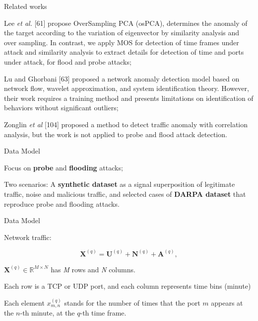 \documentclass[newPxFont, numfooter, sectionpages]{beamer}
\begin{document}
\begin{frame}[c]{Related works}
	
	Lee \emph{et al.} [61] propose OverSampling PCA (osPCA), determines the anomaly of the target according to the variation of eigenvector by similarity analysis and over sampling. In contrast, we apply MOS for detection of time frames under attack and similarity analysis to extract details for detection of time and ports under attack, for flood and probe attacks;

	Lu and Ghorbani [63] proposed a network anomaly detection model based on network flow, wavelet approximation, and system identification theory. However, their work requires a training method and presents limitations on identification of behaviors without significant outliers;

	Zonglin \emph{et al} [104] proposed a method to detect traffic anomaly with correlation analysis, but the work is not applied to probe and flood attack detection. 

\end{frame}
\begin{frame}{Data Model}
	
	Focus on \textbf{probe} and \textbf{flooding} attacks;

	Two scenarios: A \textbf{synthetic dataset} as a signal superposition of legitimate traffic, noise and malicious traffic, and selected cases of \textbf{DARPA dataset} that reproduce probe and flooding attacks.

\end{frame}
\begin{frame}{Data Model}
	
	Network traffic:

	\begin{equation}\label{eq:eq01}
		\boldsymbol{X}^{(q)} = \boldsymbol{U}^{(q)} + \boldsymbol{N}^{(q)} + \boldsymbol{A}^{(q)},
	\end{equation}

	$\boldsymbol{X}^{(q)} \in \mathbb{R}^{M \times N}$ has \emph{M} rows and \emph{N} columns. 

	Each row is a TCP or UDP port, and each column represents time bins (minute)

	Each element $x_{m,n}^{(q)}$ stands for the number of times that the port $m$ appears at the $n$-th minute, at the $q$-th time frame.

\end{frame}
\end{document}
